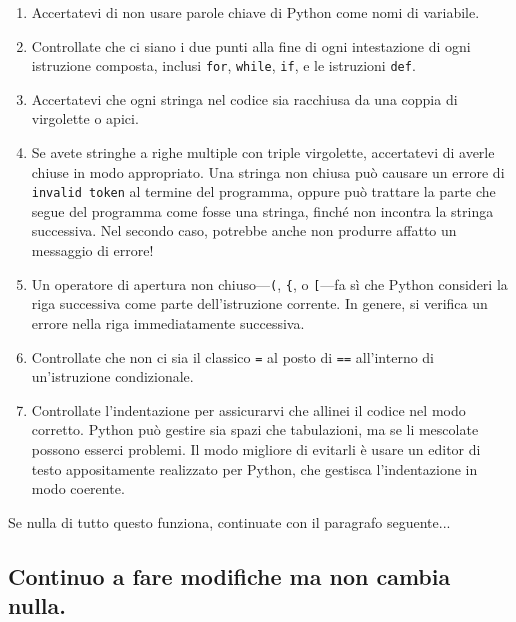 \documentclass[10pt]{book}
\begin{document}
\begin{enumerate}

\item Accertatevi di non usare parole chiave di Python come nomi di variabile.

\item Controllate che ci siano i due punti alla fine di ogni intestazione di ogni istruzione composta, inclusi {\tt for}, {\tt while},
{\tt if}, e le istruzioni {\tt def}.

\item Accertatevi che ogni stringa nel codice sia racchiusa da una coppia di virgolette o apici.

\item Se avete stringhe a righe multiple con triple virgolette, accertatevi di averle chiuse in modo appropriato. Una stringa non chiusa può causare un errore di {\tt invalid token} al termine del programma, oppure può trattare la parte che segue del programma come fosse una stringa, finché non incontra la stringa successiva. Nel secondo caso, potrebbe anche non produrre affatto un messaggio di errore!

\item Un operatore di apertura non chiuso---\verb+(+, \verb+{+, o
  \verb+[+---fa sì che Python consideri la riga successiva come parte dell'istruzione corrente. In genere, si verifica un errore nella riga immediatamente successiva.

\item Controllate che non ci sia il classico {\tt =} al posto di {\tt ==} all'interno di un'istruzione condizionale.

\item Controllate l'indentazione per assicurarvi che allinei il codice nel modo corretto. Python può gestire sia spazi che tabulazioni, ma se li mescolate possono esserci problemi. Il modo migliore di evitarli è usare un editor di testo appositamente realizzato per Python, che gestisca l'indentazione in modo coerente.

\end{enumerate}

Se nulla di tutto questo funziona, continuate con il paragrafo seguente...


\subsection{Continuo a fare modifiche ma non cambia nulla.}
\end{document}
